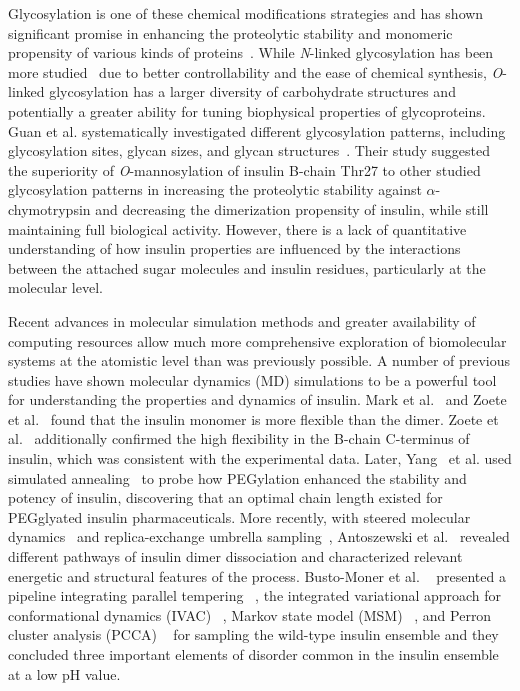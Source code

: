 \documentclass[9pt]{elife}
\begin{document}
Glycosylation is one of these chemical modifications strategies and has shown significant promise in enhancing the proteolytic stability and monomeric propensity of various kinds of proteins~\cite{kayser2011glycosylation, raju2006glycosylation,russell2009site}. While \emph{N}-linked glycosylation has been more studied~\cite{losev2019novel,van2004role, sareneva1995n} due to better controllability and the ease of chemical synthesis, \emph{O}-linked glycosylation has a larger diversity of carbohydrate structures and potentially a greater ability for tuning biophysical properties of glycoproteins. Guan et al. systematically investigated different glycosylation patterns, including glycosylation sites, glycan sizes, and glycan structures~\cite{guan2018chemically}. Their study suggested the superiority of \emph{O}-mannosylation of insulin B-chain Thr27 to other studied glycosylation patterns in increasing the proteolytic stability against $\alpha$-chymotrypsin and decreasing the dimerization propensity of insulin, while still maintaining full biological activity. However, there is a lack of quantitative understanding of how insulin properties are influenced by the interactions between the attached sugar molecules and insulin residues, particularly at the molecular level. 

Recent advances in molecular simulation methods and greater availability of computing resources allow much more comprehensive exploration of biomolecular systems at the atomistic level than was previously possible. A number of previous studies have shown molecular dynamics (MD) simulations to be a powerful tool for understanding the properties and dynamics of insulin. Mark et al.~\cite{mark1991conformational} and Zoete et al.~\cite{zoete2004comparison} found that the insulin monomer is more flexible than the dimer. Zoete et al.~\cite{zoete2004comparison} additionally confirmed the high flexibility in the B-chain C-terminus of insulin, which was consistent with the experimental data. Later, Yang~\cite{yang2011pegylation} et al. used simulated annealing~\cite{pincus1970letter} to probe how PEGylation enhanced the stability and potency of insulin, discovering that an optimal chain length existed for PEGglyated insulin pharmaceuticals. More recently, with steered molecular dynamics~\cite{isralewitz2001steered} and replica-exchange umbrella sampling~\cite{sugita2000multidimensional}, Antoszewski et al.~\cite{antoszewski2020insulin} revealed different pathways of insulin dimer dissociation and characterized relevant energetic and structural features of the process. Busto-Moner et al. ~\cite{busto2021structural} presented a pipeline integrating parallel tempering ~\cite{hansmann1997parallel, earl2005parallel}, the integrated variational approach for conformational dynamics (IVAC) ~\cite{nuske2014variational, lorpaiboon2020integrated}, Markov state model (MSM) ~\cite{prinz2011markov, bowman2013introduction}, and Perron cluster analysis (PCCA) ~\cite{schutte1999direct} for sampling the wild-type insulin ensemble and they concluded three important elements of disorder common in the insulin ensemble at a low pH value.
\end{document}
